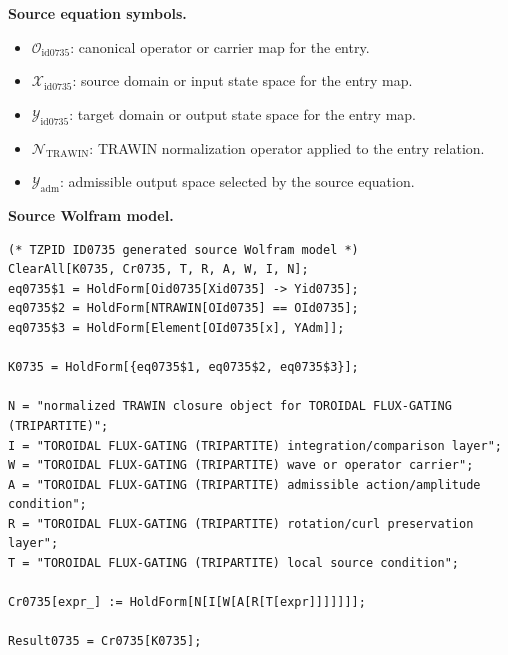 \begin{minipage}[t]{0.49\linewidth}
\begingroup
\small
\raggedright
\textbf{Source equation symbols.}\par
\begin{itemize}[leftmargin=1.35em,itemsep=1pt,topsep=1pt,parsep=0pt]
    \item $\mathcal{O}_{\mathrm{id0735}}$: canonical operator or carrier map for the entry.
    \item $\mathcal{X}_{\mathrm{id0735}}$: source domain or input state space for the entry map.
    \item $\mathcal{Y}_{\mathrm{id0735}}$: target domain or output state space for the entry map.
    \item $\mathcal{N}_{\mathrm{TRAWIN}}$: TRAWIN normalization operator applied to the entry relation.
    \item $\mathcal{Y}_{\mathrm{adm}}$: admissible output space selected by the source equation.
\end{itemize}
\endgroup
\end{minipage}\hfill
\begin{minipage}[t]{0.47\linewidth}
\begingroup
\scriptsize
\raggedright
\textbf{Source Wolfram model.}\par
\begin{Verbatim}[fontsize=\tiny,breaklines=true,breakanywhere=true]
(* TZPID ID0735 generated source Wolfram model *)
ClearAll[K0735, Cr0735, T, R, A, W, I, N];
eq0735$1 = HoldForm[Oid0735[Xid0735] -> Yid0735];
eq0735$2 = HoldForm[NTRAWIN[OId0735] == OId0735];
eq0735$3 = HoldForm[Element[OId0735[x], YAdm]];

K0735 = HoldForm[{eq0735$1, eq0735$2, eq0735$3}];

N = "normalized TRAWIN closure object for TOROIDAL FLUX-GATING (TRIPARTITE)";
I = "TOROIDAL FLUX-GATING (TRIPARTITE) integration/comparison layer";
W = "TOROIDAL FLUX-GATING (TRIPARTITE) wave or operator carrier";
A = "TOROIDAL FLUX-GATING (TRIPARTITE) admissible action/amplitude condition";
R = "TOROIDAL FLUX-GATING (TRIPARTITE) rotation/curl preservation layer";
T = "TOROIDAL FLUX-GATING (TRIPARTITE) local source condition";

Cr0735[expr_] := HoldForm[N[I[W[A[R[T[expr]]]]]]];

Result0735 = Cr0735[K0735];
\end{Verbatim}
\endgroup
\end{minipage}

